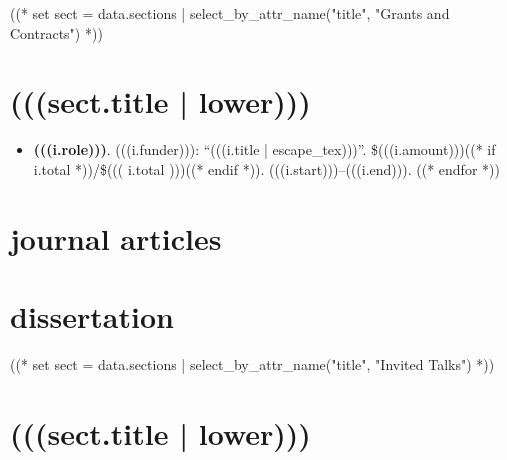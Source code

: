 \documentclass[10pt,oneside]{article}
\begin{document}
((* set sect = data.sections | select_by_attr_name("title", "Grants and Contracts") *))
\section{(((sect.title | lower)))}

\mbox{}\vspace{-\dimexpr\baselineskip\relax}

\begin{itemize}[label={}]
  ((* for i in sect.entries.grants | sort_by_attr(["start"], reverse=True) *))
  \item \textbf{(((i.role)))}. (((i.funder))): \enquote{(((i.title | escape_tex)))}. \$(((i.amount)))((* if i.total *))/\$((( i.total )))((* endif *)). (((i.start)))--(((i.end))).
        ((* endfor *))
\end{itemize}


\section{journal articles}

\mbox{}\vspace{-\dimexpr\baselineskip\relax}
\vspace*{-1em}

\printbibliography[type=article, heading=none]

\section{dissertation}

\mbox{}\vspace{-\dimexpr\baselineskip\relax}
\vspace*{-1em}
\printbibliography[type=thesis, heading=none]



((* set sect = data.sections | select_by_attr_name("title", "Invited Talks") *))
\section{(((sect.title | lower)))}
\end{document}
